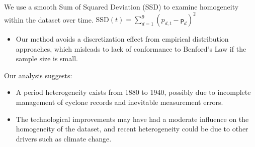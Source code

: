 \documentclass[a0paper,portrait]{baposter}
\begin{document}
\begin{poster}
{\begin{minipage}[l]{0.53\textwidth}
\begin{myindentpar}{0.3cm}
We use a smooth Sum of Squared Deviation (SSD) to  examine  homogeneity within the dataset over time.  \quad $\text{SSD}(t)=\sum_{d=1}^{9} (p_{d,t} - \textsf{p}_d)^2$
\end{myindentpar}
\begin{itemize}[leftmargin=0.7cm]
\item Our method avoids a discretization effect from empirical distribution approaches, which  misleads to  lack of conformance to Benford's Law  if the sample size is small.
\end{itemize}
\begin{myindentpar}{0.3cm}
Our analysis suggests:
\end{myindentpar}
\begin{itemize}[leftmargin=0.6cm]
\item A period heterogeneity exists from 1880 to 1940, possibly due to incomplete management of cyclone records and inevitable measurement errors.
\item The technological improvements may have had a moderate influence on the homogeneity of the dataset, and recent heterogeneity could be due to other drivers such as climate change.
\end{itemize}



\end{minipage}}
\end{poster}
\end{document}
